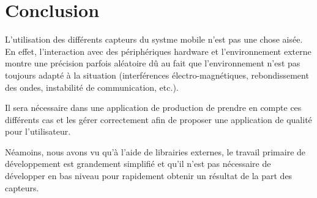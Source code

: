 \documentclass[a4paper]{article}
\begin{document}
\section{Conclusion}

L'utilisation des différents capteurs du systme mobile n'est pas une chose aisée. En effet, l'interaction avec des périphériques hardware et l'environnement externe montre une précision parfois aléatoire dû au fait que l'environnement n'est pas toujours adapté à la situation (interférences électro-magnétiques, rebondissement des ondes, instabilité de communication, etc.).

Il sera nécessaire dans une application de production de prendre en compte ces différents cas et les gérer correctement afin de proposer une application de qualité pour l'utilisateur.

Néamoins, nous avons vu qu'à l'aide de librairies externes, le travail primaire de développement est grandement simplifié et qu'il n'est pas nécessaire de développer en bas niveau pour rapidement obtenir un résultat de la part des capteurs.
\end{document}
